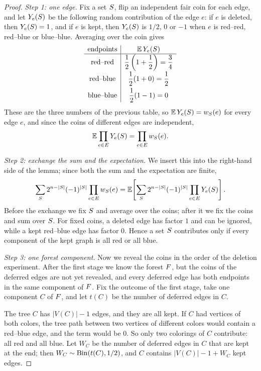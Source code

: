 \begin{proof}
\emph{Step 1: one edge.} Fix a set \(S\), flip an independent fair coin
for each edge, and let \(Y_e(S)\) be the following random contribution
of the edge \(e\): if \(e\) is deleted, then \(Y_e(S)=1\), and if \(e\)
is kept, then \(Y_e(S)\) is \(1/2\), \(0\) or \(-1\) when \(e\) is
red--red, red--blue or blue--blue. Averaging over the coin gives
\[
\begin{array}{c|c}
\text{endpoints} & \mathbb{E}\,Y_e(S)\\
\hline
\text{red--red}
&\displaystyle \frac12\left(1+\frac12\right)=\frac34\\[0.7em]
\text{red--blue}
&\displaystyle \frac12(1+0)=\frac12\\[0.7em]
\text{blue--blue}
&\displaystyle \frac12(1-1)=0
\end{array}
\]
These are the three numbers of the previous table, so
\(\mathbb{E}\,Y_e(S)=w_{S}(e)\) for every edge \(e\), and since the
coins of different edges are independent,
\[
  \mathbb{E}\prod_{e\in E}Y_e(S)
  =\prod_{e\in E}w_{S}(e).
\]

\emph{Step 2: exchange the sum and the expectation.} We insert this into the
right-hand side of the lemma; since both the sum and the expectation are
finite,
\begin{equation}\label{eq:swap-sum-expectation}
  \sum_{\freeset} 2^{\nvert-|\freeset|}(-1)^{|\freeset|}
    \prod_{e\in \Eset}\edgefac{\freeset}{e}
  =\Ex{\sum_{\freeset}
      2^{\nvert-|\freeset|}(-1)^{|\freeset|}
      \prod_{e\in \Eset}Y_e(\freeset)}.
\end{equation}
Before the exchange we fix \(S\) and average over the coins; after it we
fix the coins and sum over \(S\). For fixed coins, a deleted edge has
factor \(1\) and can be ignored, while a kept red--blue edge has factor \(0\).
Hence a set \(S\) contributes only if every component of the kept graph
is all red or all blue.

\emph{Step 3: one forest component.} Now we reveal the coins in the order of
the deletion experiment. After the first stage we know the forest \(F\),
but the coins of the deferred edges are not yet revealed, and every deferred
edge has both endpoints in the same component of \(F\). Fix the outcome of
the first stage, take one component \(C\) of \(F\), and let \(t(C)\) be the
number of deferred edges in \(C\).

The tree \(C\) has \(|V(C)|-1\) edges, and they are all kept. If \(C\) had
vertices of both colors, the tree path between two vertices of different colors
would contain a red--blue edge, and the term would be \(0\). So only two
colorings of \(C\) contribute: all red and all blue. Let \(W_C\) be the number
of deferred edges in \(C\) that are kept at the end; then
\(W_C\sim\operatorname{Bin}(t(C),1/2)\), and \(C\) contains \(|V(C)|-1+W_C\) kept edges.


\end{proof}
